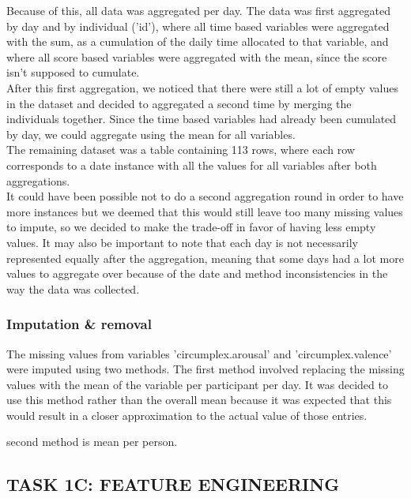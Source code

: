 \documentclass[runningheads]{llncs}
\begin{document}
Because of this, all data was aggregated per day. The data was first aggregated by day and by individual ('id'), where all time based variables were aggregated with the sum, as a cumulation of the daily time allocated to that variable, and where all score based variables were aggregated with the mean, since the score isn't supposed to cumulate. \\

After this first aggregation, we noticed that there were still a lot of empty values in the dataset and decided to aggregated a second time by merging the individuals together. Since the time based variables had already been cumulated by day, we could aggregate using the mean for all variables. \\

The remaining dataset was a table containing 113 rows, where each row corresponds to a date instance with all the values for all variables after both aggregations. \\

It could have been possible not to do a second aggregation round in order to have more instances but we deemed that this would still leave too many missing values to impute, so we decided to make the trade-off in favor of having less empty values. It may also be important to note that each day is not necessarily represented equally after the aggregation, meaning that some days had a lot more values to aggregate over because of the date and method inconsistencies in the way the data was collected. \\



\subsubsection{Imputation \& removal} %
\phantom
\smallskip

The missing values from variables 'circumplex.arousal' and 'circumplex.valence' were imputed using two methods. The first method involved replacing the missing values with the mean of the variable per participant per day. It was decided to use this method rather than the overall mean because it was expected that this would result in a closer approximation to the actual value of those entries.

second method is mean per person. 


\subsection{TASK 1C: FEATURE ENGINEERING}
\end{document}
